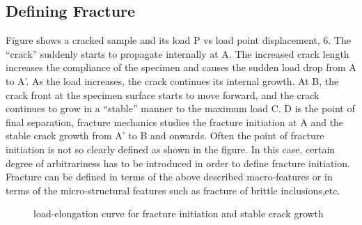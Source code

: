 \documentclass[11pt]{article}
\begin{document}
\subsection{Defining Fracture}Figure shows a cracked sample and its load P vs load point displacement, 6. The “crack” suddenly starts to propagate internally at A. The increased crack length increases the compliance of the specimen and causes the sudden load drop from A to A'. As the load increases, the crack continues its internal growth. At B, the crack front at the specimen surface starts to move forward, and the crack continues to grow in a “stable” manner to the maximum load C. D is the point of final separation, fracture mechanics studies the fracture initiation at A and the stable crack growth from A' to B and onwards. Often the point of fracture initiation is not so clearly defined as shown in the figure. In this case, certain degree of arbitrariness has to be introduced in order to define fracture initiation. Fracture can be defined in terms of the above described macro-features or in terms of the micro-structural features such as fracture of brittle inclusions,etc.
\begin{figure}[H]
    \centering
    \captionsetup{labelformat=empty}
    \caption{load-elongation curve for fracture initiation and stable crack growth}  
\end{figure}
\end{document}
